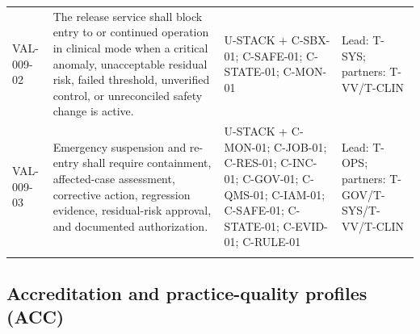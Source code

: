 \documentclass[11pt,letterpaper]{article}
\begin{document}
\begin{scriptsize}
\begin{longtable}{@{}L{0.115\textwidth}L{0.345\textwidth}L{0.265\textwidth}L{0.195\textwidth}@{}}
\addlinespace[2pt]
\mbox{VAL-009-02} & The release service shall block entry to or continued operation in clinical mode when a critical anomaly, unacceptable residual risk, failed threshold, unverified control, or unreconciled safety change is active. & U-STACK + C-SBX-01; C-SAFE-01; C-STATE-01; C-MON-01 & Lead: T-SYS; partners: T-VV\slash\allowbreak{}T-CLIN \\
\addlinespace[2pt]
\mbox{VAL-009-03} & Emergency suspension and re-entry shall require containment, affected-case assessment, corrective action, regression evidence, residual-risk approval, and documented authorization. & U-STACK + C-MON-01; C-JOB-01; C-RES-01; C-INC-01; C-GOV-01; C-QMS-01; C-IAM-01; C-SAFE-01; C-STATE-01; C-EVID-01; C-RULE-01 & Lead: T-OPS; partners: T-GOV\slash\allowbreak{}T-SYS\slash\allowbreak{}T-VV\slash\allowbreak{}T-CLIN \\
\addlinespace[2pt]
\end{longtable}
\end{scriptsize}

\subsection{Accreditation and practice-quality profiles (ACC)}
\end{document}

